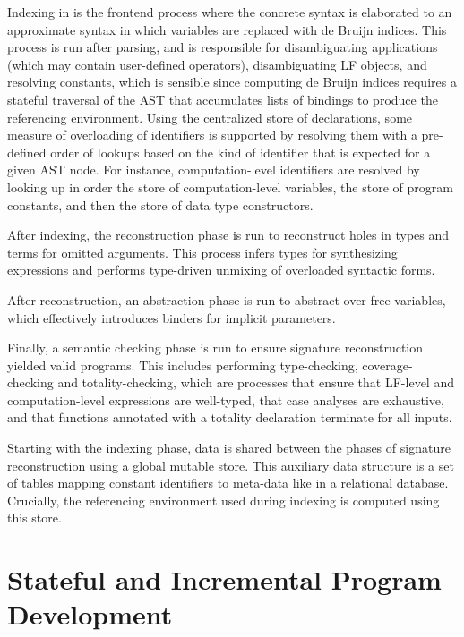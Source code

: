 Indexing in \Beluga is the frontend process where the concrete syntax is elaborated to an approximate syntax in which variables are replaced with de Bruijn indices.
This process is run after parsing, and is responsible for disambiguating applications (which may contain user-defined operators), disambiguating \ac{LF} objects, and resolving constants, which is sensible since computing de Bruijn indices requires a stateful traversal of the \ac{AST} that accumulates lists of bindings to produce the referencing environment.
Using the centralized store of declarations, some measure of overloading of identifiers is supported by resolving them with a pre-defined order of lookups based on the kind of identifier that is expected for a given \ac{AST} node.
For instance, computation-level identifiers are resolved by looking up in order the store of computation-level variables, the store of program constants, and then the store of data type constructors.

After indexing, the reconstruction phase is run to reconstruct holes in types and terms for omitted arguments.
This process infers types for synthesizing expressions and performs type-driven unmixing of overloaded syntactic forms.

After reconstruction, an abstraction phase is run to abstract over free variables, which effectively introduces binders for implicit parameters.

Finally, a semantic checking phase is run to ensure signature reconstruction yielded valid programs.
This includes performing type-checking, coverage-checking and totality-checking, which are processes that ensure that \ac{LF}-level and computation-level expressions are well-typed, that case analyses are exhaustive, and that functions annotated with a totality declaration terminate for all inputs.

Starting with the indexing phase, data is shared between the phases of signature reconstruction using a global mutable store.
This auxiliary data structure is a set of tables mapping constant identifiers to meta-data like in a relational database.
Crucially, the referencing environment used during indexing is computed using this store.



\section{Stateful and Incremental Program Development}

